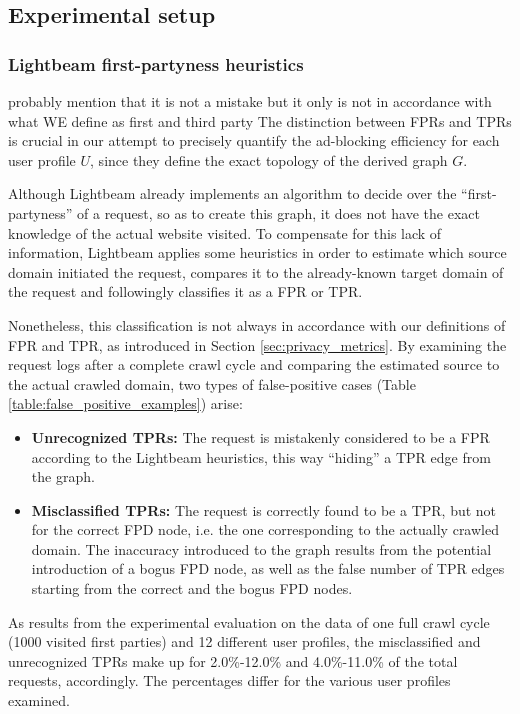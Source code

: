 \documentclass{sig-alternate}
\begin{document}
\subsection{Experimental setup}
\subsubsection{Lightbeam first-partyness heuristics}
{\color{red}probably mention that it is not a mistake but it only is not in accordance with what WE define as first and third party}
The distinction between FPRs and TPRs is crucial in our attempt to precisely quantify the ad-blocking efficiency for each user profile $U$, since they define the exact topology of the derived graph $G$.

Although Lightbeam already implements an algorithm to decide over the ``first-partyness'' of a request, so as to create this graph, it does not have the exact knowledge of the actual website visited. To compensate for this lack of information, Lightbeam applies some heuristics in order to estimate which source domain initiated the request, compares it to the already-known target domain of the request and followingly classifies it as a FPR or TPR.

{\color{blue}Nonetheless, this classification is not always in accordance with our definitions of FPR and TPR, as introduced in Section \ref{sec:privacy_metrics}.} By examining the request logs after a complete crawl cycle and comparing the estimated source to the actual crawled domain, two types of false-positive cases (Table \ref{table:false_positive_examples}) arise:

\begin{itemize}
\item \textbf{Unrecognized TPRs:} The request is mistakenly considered to be a FPR according to the Lightbeam heuristics, this way ``hiding'' a TPR edge from the graph.
\item \textbf{Misclassified TPRs:} The request is correctly found to be a TPR, but not for the correct FPD node, i.e. the one corresponding to the actually crawled domain. The inaccuracy introduced to the graph results from the potential introduction of a bogus FPD node, as well as the false number of TPR edges starting from the correct and the bogus FPD nodes.
\end{itemize}

As results from the experimental evaluation on the data of one full crawl cycle (1000 visited first parties) and 12 different user profiles, the misclassified and unrecognized TPRs make up for 2.0\%-12.0\% and 4.0\%-11.0\% of the total requests, accordingly. The percentages differ for the various user profiles examined.
\end{document}
